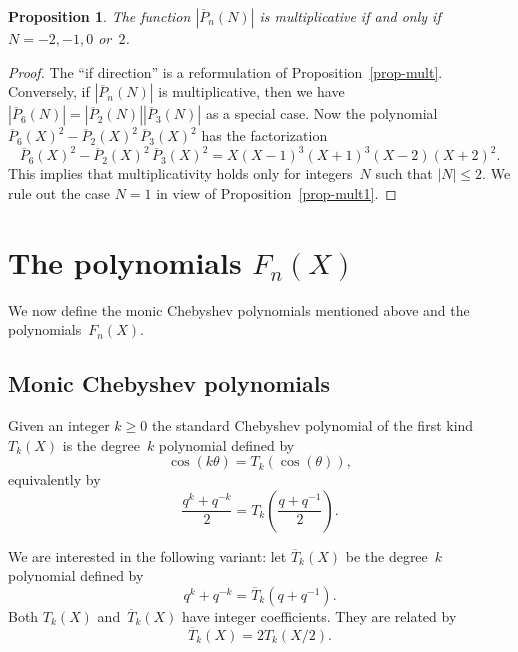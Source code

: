 \documentclass[11pt, a4paper]{amsart}
\newtheorem{prop}[theorem]{Proposition}
\theoremstyle{definition}
\newcommand\Pg{\overline{P}}
\newcommand\TT{\overline{T}}
\numberwithin{equation}{section}
\begin{document}
\begin{prop}
The function $|\Pg_n(N)|$ is multiplicative if and only if $N= -2, -1, 0$ or~$2$.
\end{prop}

\begin{proof}
The ``if direction'' is a reformulation of Proposition~\ref{prop-mult}. Conversely,
if $|\Pg_n(N)|$ is multiplicative, then we have $|\Pg_6(N)| = |\Pg_2(N)| |\Pg_3(N)|$ as a special case. 
Now the polynomial $\Pg_6(X)^2  -  \Pg_2(X)^2 \, \Pg_3(X)^2$ has the factorization
\begin{equation*}
\Pg_6(X)^2  -  \Pg_2(X)^2 \, \Pg_3(X)^2 = X(X-1)^3 (X+1)^3 (X-2)(X+2)^2 .
\end{equation*}
This implies that multiplicativity holds only for integers~$N$ such that $|N| \leq 2$.
We rule out the case $N = 1$ in view of Proposition~\ref{prop-mult1}.
\end{proof}



\section{The polynomials $F_n(X)$}\label{sec-aux}

We now define the monic Chebyshev polynomials mentioned above and the polynomials~$F_n(X)$. 

\subsection{Monic Chebyshev polynomials}\label{ssec-Tchb}

Given an integer $k\geq 0$ the standard Chebyshev polynomial of the first kind~$T_k(X)$ is the degree~$k$
polynomial defined by
\begin{equation*}
\cos(k \theta) = T_k(\cos (\theta)) ,
\end{equation*}
equivalently by
\begin{equation*}
\frac{q^k + q^{-k}}{2} = T_k \left( \frac{q + q^{-1}}{2} \right) .
\end{equation*}

We are interested in the following variant:
let $\TT_k(X)$ be the degree~$k$ polynomial defined by
\begin{equation}\label{defTT}
q^k + q^{-k} = \TT_k (q + q^{-1}).
\end{equation}
Both $T_k (X)$ and~$\TT_k(X)$ have integer coefficients.
They are related by
\begin{equation}\label{eq-TTT}
\TT_k (X) = 2 T_k(X/2) .
\end{equation}
\end{document}
